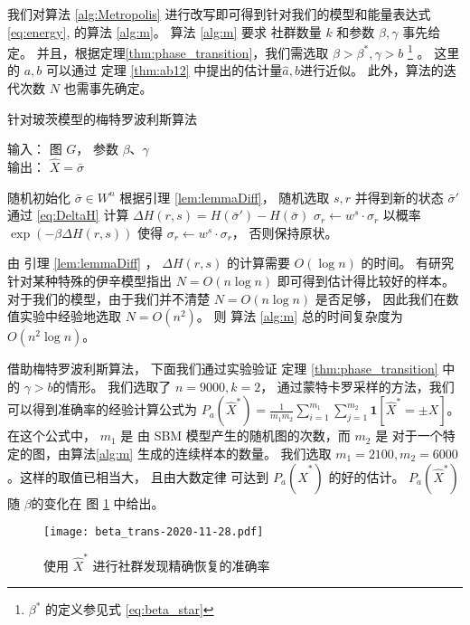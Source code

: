我们对算法 \ref{alg:Metropolis}
进行改写即可得到针对我们的模型和能量表达式 \eqref{eq:energy},
的算法 \ref{alg:m}。
算法 \ref{alg:m} 要求
社群数量 $k$ 和参数 $\beta, \gamma$ 事先给定。
并且，根据定理\ref{thm:phase_transition}，我们需选取  $\beta>\beta^*, \gamma > b$
\footnote{ $\beta^*$ 的定义参见式 \eqref{eq:beta_star} }
。
这里的 $a, b$
可以通过 定理 \ref{thm:ab12} 中提出的估计量$\hat{a},\hat{b}$进行近似。
此外，算法的迭代次数  $N$
也需事先确定。
\begin{algorithm}[H]
	\caption{针对玻茨模型的梅特罗波利斯算法} \label{alg:m}
	输入： 图 $G$， 参数 $\beta$、$\gamma$ \\
	输出： $\hat{X} = \bar{\sigma}$
	\begin{algorithmic}[1]
		\STATE 随机初始化 $\bar{\sigma} \in W^n$ %
		\STATE 根据引理 \ref{lem:lemmaDiff}，
		随机选取 $s, r$ 并得到新的状态
		 $\bar{\sigma}'$
		\STATE 通过 \eqref{eq:DeltaH} 计算 $\Delta H(r,s) = H(\bar{\sigma}') - H(\bar{\sigma})$ %
		\STATE $\sigma_r \leftarrow w^s \cdot \sigma_r$ %
		\ELSE
		\STATE 以概率 $\exp(-\beta \Delta H(r,s))$ 使得
			$\sigma_r \leftarrow w^s \cdot \sigma_r$，
			否则保持原状。 %
		\ENDIF %
		\ENDFOR
	\end{algorithmic}
\end{algorithm}
 由 引理 \ref{lem:lemmaDiff} ， $\Delta H(r,s)$ 的计算需要 $O(\log n)$ 的时间。
有研究针对某种特殊的伊辛模型指出
$N=O(n\log n)$ 即可得到估计得比较好的样本\cite{mcmc}。
对于我们的模型，由于我们并不清楚 $ N = O(n\log n)$ 是否足够，
因此我们在数值实验中经验地选取 $N=O(n^2)$。
则 算法 \ref{alg:m} 总的时间复杂度为 $O(n^2 \log n)$。



借助梅特罗波利斯算法，
下面我们通过实验验证 定理 \ref{thm:phase_transition} 中的 $\gamma > b$的情形。
我们选取了 $n=9000, k=2$，
通过蒙特卡罗采样的方法，我们可以得到准确率的经验计算公式为
$P_a(\hat{X}^*) = \frac{1}{m_1m_2}\sum_{i=1}^{m_1} \sum_{j=1}^{m_2} \mathbf{1}[\hat{X}^* = \pm X]$。
在这个公式中，
$m_1$ 是 由 SBM 模型产生的随机图的次数，而
$m_2$ 是 对于一个特定的图，由算法\ref{alg:m} 生成的连续样本的数量。
我们选取 $m_1=2100,m_2=6000$。这样的取值已相当大，
且由大数定律
可达到 $P_a(\hat{X}^*)$ 的好的估计。
$P_a(\hat{X}^*)$ 随 $\beta$的变化在 图 \ref{fig:erh}
中给出。

\begin{figure}[ht!]
	\centering
		\texttt{[image: beta\_trans-2020-11-28.pdf]}
		\caption{使用 $\hat{X}^*$ 进行社群发现精确恢复的准确率}\label{fig:erh}
\end{figure}


